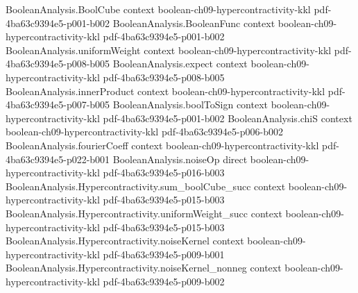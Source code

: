 \begin{theorem}
\leanok
{}
\label{BooleanAnalysis.Hypercontractivity.hypercontractivity_induction}
\proofstep
  {BooleanAnalysis.BoolCube}
  {context}
  {boolean-ch09-hypercontractivity-kkl}
  {pdf-4ba63c9394e5-p001-b002}
\proofstep
  {BooleanAnalysis.BooleanFunc}
  {context}
  {boolean-ch09-hypercontractivity-kkl}
  {pdf-4ba63c9394e5-p001-b002}
\proofstep
  {BooleanAnalysis.uniformWeight}
  {context}
  {boolean-ch09-hypercontractivity-kkl}
  {pdf-4ba63c9394e5-p008-b005}
\proofstep
  {BooleanAnalysis.expect}
  {context}
  {boolean-ch09-hypercontractivity-kkl}
  {pdf-4ba63c9394e5-p008-b005}
\proofstep
  {BooleanAnalysis.innerProduct}
  {context}
  {boolean-ch09-hypercontractivity-kkl}
  {pdf-4ba63c9394e5-p007-b005}
\proofstep
  {BooleanAnalysis.boolToSign}
  {context}
  {boolean-ch09-hypercontractivity-kkl}
  {pdf-4ba63c9394e5-p001-b002}
\proofstep
  {BooleanAnalysis.chiS}
  {context}
  {boolean-ch09-hypercontractivity-kkl}
  {pdf-4ba63c9394e5-p006-b002}
\proofstep
  {BooleanAnalysis.fourierCoeff}
  {context}
  {boolean-ch09-hypercontractivity-kkl}
  {pdf-4ba63c9394e5-p022-b001}
\proofstep
  {BooleanAnalysis.noiseOp}
  {direct}
  {boolean-ch09-hypercontractivity-kkl}
  {pdf-4ba63c9394e5-p016-b003}
\proofstep
  {BooleanAnalysis.Hypercontractivity.sum_boolCube_succ}
  {context}
  {boolean-ch09-hypercontractivity-kkl}
  {pdf-4ba63c9394e5-p015-b003}
\proofstep
  {BooleanAnalysis.Hypercontractivity.uniformWeight_succ}
  {context}
  {boolean-ch09-hypercontractivity-kkl}
  {pdf-4ba63c9394e5-p015-b003}
\proofstep
  {BooleanAnalysis.Hypercontractivity.noiseKernel}
  {context}
  {boolean-ch09-hypercontractivity-kkl}
  {pdf-4ba63c9394e5-p009-b001}
\proofstep
  {BooleanAnalysis.Hypercontractivity.noiseKernel_nonneg}
  {context}
  {boolean-ch09-hypercontractivity-kkl}
  {pdf-4ba63c9394e5-p009-b002}

\end{theorem}
